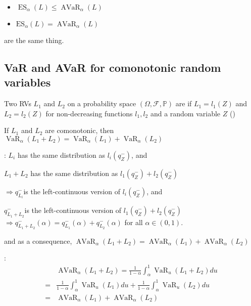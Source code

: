 \begin{itemize}[leftmargin=*]
    \item $\operatorname{ES}_{\alpha}(L) \leq \operatorname{AVaR}_{\alpha}(L)$
    \item $\mathrm{ES}_{\alpha}(L)=\operatorname{AVaR}_{\alpha}(L)$ 
\end{itemize}

 are the same thing. 





\subsection*{VaR and AVaR for comonotonic random variables}
Two RVs $L_{1}$ and $L_{2}$ on a probability space $(\Omega, \mathcal{F}, \mathbb{P})$ are  if $L_{1}=l_{1}(Z)$ and $L_{2}=l_{2}(Z)$ for non-decreasing functions $l_{1}, l_{2}$ and a random variable $Z$ ()

If $L_{1}$ and $L_{2}$ are comonotonic, then $\operatorname{VaR}_{\alpha}\left(L_{1}+L_{2}\right)=\operatorname{VaR}_{\alpha}\left(L_{1}\right)+\operatorname{VaR}_{\alpha}\left(L_{2}\right)$

: $L_{i}$ has the same distribution as $l_{i}\left(q_{Z}^{-}\right)$, and

$L_{1}+L_{2}$ has the same distribution as $l_{1}\left(q_{Z}^{-}\right)+l_{2}\left(q_{Z}^{-}\right)$

$\Rightarrow q_{L_{i}}^{-}$is the left-continuous version of $l_{i}\left(q_{Z}^{-}\right)$, and

$q_{L_{1}+L_{2}}^{-}$is the left-continuous version of $l_{1}\left(q_{Z}^{-}\right)+l_{2}\left(q_{Z}^{-}\right)$
$\Rightarrow q_{L_{1}+L_{2}}^{-}(\alpha)=q_{L_{1}}^{-}(\alpha)+q_{L_{2}}^{-}(\alpha)$ for all $\alpha \in(0,1)$.


and as a consequence, $\operatorname{AVaR}_{\alpha}\left(L_{1}+L_{2}\right)=\operatorname{AVaR}_{\alpha}\left(L_{1}\right)+\operatorname{AVaR}_{\alpha}\left(L_{2}\right)$

:
$$
\begin{aligned}
&\operatorname{AVaR}_{\alpha}\left(L_{1}+L_{2}\right)=\frac{1}{1-\alpha} \int_{\alpha}^{1} \operatorname{VaR}_{u}\left(L_{1}+L_{2}\right) d u \\
=& \frac{1}{1-\alpha} \int_{\alpha}^{1} \operatorname{VaR}_{u}\left(L_{1}\right) d u+\frac{1}{1-\alpha} \int_{\alpha}^{1} \operatorname{VaR}_{u}\left(L_{2}\right) d u \\
=&\operatorname{AVaR}_{\alpha}\left(L_{1}\right)+\operatorname{AVaR}_{\alpha}\left(L_{2}\right)
\end{aligned}
$$




